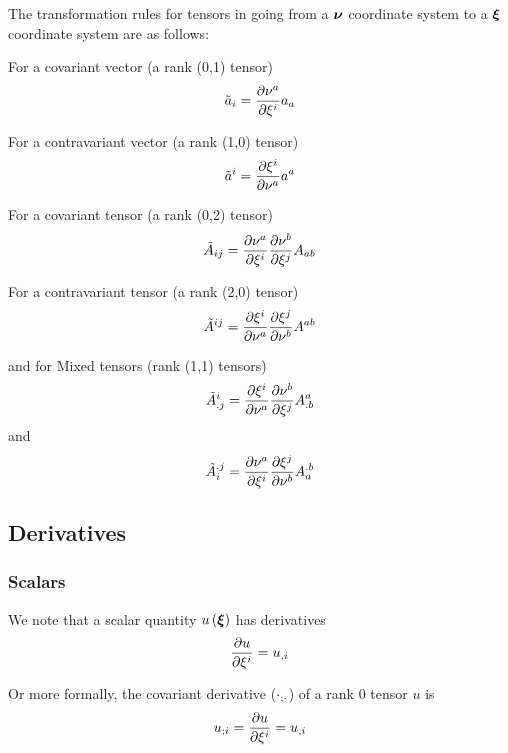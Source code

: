 The transformation rules for tensors in going from a $ \boldsymbol{\nu} $ coordinate
system to a $ \boldsymbol{\xi} $ coordinate system are as follows: 


For a covariant vector (a rank (0,1) tensor)
\begin{equation}
  {\tilde{a}}_{i}= \dfrac{\partial \nu^{a}}{\partial \xi^{i}} a_{a}
\end{equation}

For a contravariant vector (a rank (1,0) tensor)
\begin{equation}
  {\tilde{a}}^{i}= \dfrac{\partial \xi^{i}}{\partial \nu^{a}} a^{a}
\end{equation}

For a covariant tensor (a rank (0,2) tensor)
\begin{equation}
  {\tilde{A}}_{ij}= \dfrac{\partial \nu^{a}}{\partial \xi^{i}}  \dfrac{\partial \nu^{b}}{\partial \xi^{j}} A_{ab} 
\end{equation}

For a contravariant tensor (a rank (2,0) tensor)
\begin{equation}
  {\tilde{A}}^{ij}= \dfrac{\partial \xi^{i}}{\partial \nu^{a}}  \dfrac{\partial \xi^{j}}{\partial \nu^{b}} A^{ab}
\end{equation}

and for Mixed tensors (rank (1,1) tensors)
\begin{equation}
  {\tilde{A}}^{i}_{.j}= \dfrac{\partial \xi^{i}}{\partial \nu^{a}}  \dfrac{\partial \nu^{b}}{\partial \xi^{j}} A^{a}_{.b}
\end{equation}
and
\begin{equation}
  {\tilde{A}}_{i}^{.j}= \dfrac{\partial \nu^{a}}{\partial \xi^{i}}  \dfrac{\partial \xi^{j}}{\partial \nu^{b}} A_{a}^{.b}
\end{equation}

\subsection{Derivatives}
\label{subsec:function derivatives}

\subsubsection{Scalars}

We note that a scalar quantity $ u\left(  \boldsymbol{\xi}  \right) $ has derivatives
\begin{equation}
   \dfrac{\partial u}{\partial \xi^{i}} = {u}_{,i} 
\end{equation}

Or more formally, the covariant derivative ($ {\cdot}_{;\cdot} $) of a
rank 0 tensor $u$ is
\begin{equation}
   {u}_{;i} = \dfrac{\partial u}{\partial \xi^{i}} = {u}_{,i} 
\end{equation}

